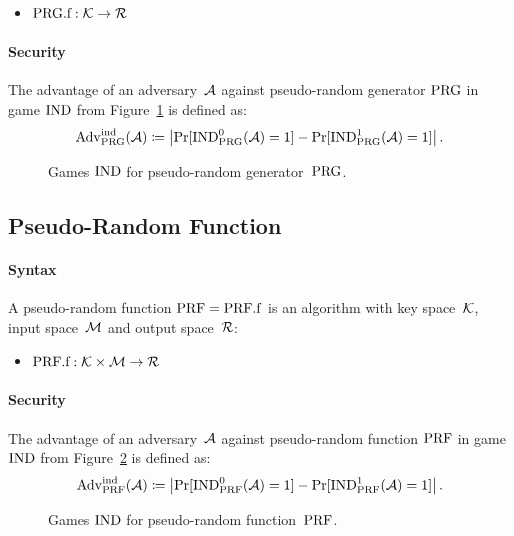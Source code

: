 \documentclass[a4paper,orivec]{llncs}
\begin{document}
\begin{itemize}
    \item $\mathrm{PRG}.\mathrm{f}: \mathcal{K} \to \mathcal{R}$
\end{itemize}

\paragraph{Security}
The advantage of an adversary~$\mathcal{A}$ against pseudo-random generator $\mathrm{PRG}$ in game ${\mathrm{IND}}$ from Figure~\ref{fig:prg:ind} is defined as:
\[
\mathrm{Adv}_{\mathrm{PRG}}^{\mathrm{ind}}(\mathcal{A})\coloneqq\left|\Pr[{\mathrm{IND}}_{\mathrm{PRG}}^0(\mathcal{A})=1]-\Pr[{\mathrm{IND}}_{\mathrm{PRG}}^1(\mathcal{A})=1]\right|\text{.}
\]

\begin{figure}[!ht]
    \centering
    \nicoresetlinenr%
    \fbox{%
        \scalebox{\codescalefactor}{%
        }%
    }
    \caption{%
        Games ${\mathrm{IND}}$ for pseudo-random generator~$\mathrm{PRG}$.
    }
    \label{fig:prg:ind}
\end{figure}

\subsection{Pseudo-Random Function}

\paragraph{Syntax}
A pseudo-random function $\mathrm{PRF}=\mathrm{PRF}.\mathrm{f}$ is an algorithm with key space~$\mathcal{K}$, input space~$\mathcal{M}$ and output space~$\mathcal{R}$:

\begin{itemize}
    \item $\mathrm{PRF}.\mathrm{f}: \mathcal{K}\times\mathcal{M} \to \mathcal{R}$
\end{itemize}

\paragraph{Security}
The advantage of an adversary~$\mathcal{A}$ against pseudo-random function $\mathrm{PRF}$ in game ${\mathrm{IND}}$ from Figure~\ref{fig:prf:ind} is defined as:
\[
\mathrm{Adv}_{\mathrm{PRF}}^{\mathrm{ind}}(\mathcal{A})\coloneqq\left|\Pr[{\mathrm{IND}}_{\mathrm{PRF}}^0(\mathcal{A})=1]-\Pr[{\mathrm{IND}}_{\mathrm{PRF}}^1(\mathcal{A})=1]\right|\text{.}
\]

\begin{figure}[!ht]
    \centering
    \nicoresetlinenr%
    \fbox{%
        \scalebox{\codescalefactor}{%
        }%
    }
    \caption{%
        Games ${\mathrm{IND}}$ for pseudo-random function~$\mathrm{PRF}$.
    }
    \label{fig:prf:ind}
\end{figure}
\end{document}
